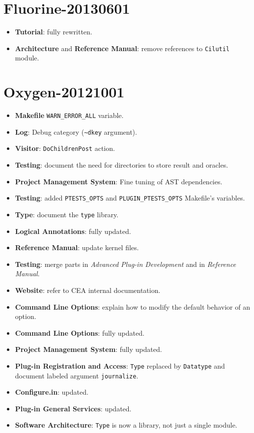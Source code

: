 \section*{Fluorine-20130601}

\begin{itemize}
\item \textbf{Tutorial}: fully rewritten.
\item \textbf{Architecture} and \textbf{Reference Manual}: remove references
      to \texttt{Cilutil} module.
\end{itemize}

\section*{Oxygen-20121001}

\begin{itemize}
\item \textbf{Makefile} \texttt{WARN\_ERROR\_ALL} variable.
\item \textbf{Log}: Debug category (\texttt{\~{}dkey} argument).
\item \textbf{Visitor}: \texttt{DoChildrenPost} action.
\item \textbf{Testing}: document the need for directories
  to store result and oracles.
\item \textbf{Project Management System}: Fine tuning of AST dependencies.
\item \textbf{Testing}: added \texttt{PTESTS\_OPTS} and
  \texttt{PLUGIN\_PTESTS\_OPTS} Makefile's variables.
\item \textbf{Type}: document the \texttt{type} library.
\item \textbf{Logical Annotations}: fully updated.
\item \textbf{Reference Manual}: update kernel files.
\item \textbf{Testing}: merge parts in \emph{Advanced Plug-in Development} and
  in \emph{Reference Manual}.
\item \textbf{Website}: refer to CEA internal documentation.
\item \textbf{Command Line Options}: explain how to modify the default behavior
  of an option.
\item \textbf{Command Line Options}: fully updated.
\item \textbf{Project Management System}: fully updated.
\item \textbf{Plug-in Registration and Access}: \texttt{Type} replaced by
  \texttt{Datatype} and document labeled argument \texttt{journalize}.
\item \textbf{Configure.in}: updated.
\item \textbf{Plug-in General Services}: updated.
\item \textbf{Software Architecture}: \texttt{Type} is now a library, not just a
  single module.
\end{itemize}

